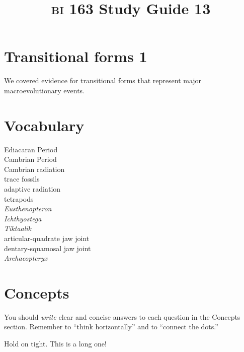 \documentclass[letterpaper]{tufte-handout}
\title{{\scshape bi} 163 Study Guide 13}
\date{} %
\begin{document}
\maketitle	%

\section*{Transitional forms 1}

We covered evidence for transitional forms that represent major macroevolutionary events.

\section*{Vocabulary}

\vspace{-1\baselineskip}
\begin{multicols}{2}
Ediacaran Period\\
Cambrian Period\\
Cambrian radiation\\
trace fossils \\
adaptive radiation \\
tetrapods \\
\textit{Eusthenopteron} \\
\textit{Ichthyostega} \\
\textit{Tiktaalik} \\
articular-quadrate jaw joint \\
dentary-squamosal jaw joint\\
\textit{Archaeopteryx} \\
\end{multicols}

\section*{Concepts}

You should \emph{write} clear and concise answers to each question in the Concepts section.  Remember to ``think horizontally'' and to ``connect the dots.'' \vspace*{\baselineskip}

Hold on tight. This is a long one!
\end{document}
